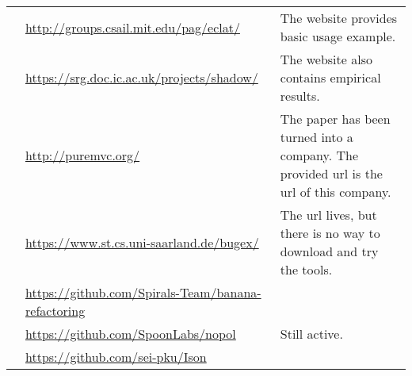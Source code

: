 \begin{table}[!h]
\begin{tabularx}{\textwidth}{lXX}
	    \cite{Pacheco2005}                        & \url{http://groups.csail.mit.edu/pag/eclat/}                      & The website provides basic usage example.\\
	    \cite{palikareva2016shadow}               & \url{https://srg.doc.ic.ac.uk/projects/shadow/}                   & The website also contains empirical results.\\
	    \cite{pezze2013}                          & \url{http://puremvc.org/}                                         & The paper has been turned into a company. The provided url is the url of this company.\\
	    \cite{robetaler2012isolating}             & \url{https://www.st.cs.uni-saarland.de/bugex/}                    & The url lives, but there is no way to download and try the tools. \\
	    \cite{xuan:hal-01309004}                  & \url{https://github.com/Spirals-Team/banana-refactoring}          & \\
	    \cite{xuanTSE2016Nopol}                   & \url{https://github.com/SpoonLabs/nopol}                          & Still active. \\
	    \cite{Zhang2016Isomorphic}                & \url{https://github.com/sei-pku/Ison}                             & \\
	    \bottomrule
	\end{tabularx}
\end{table}